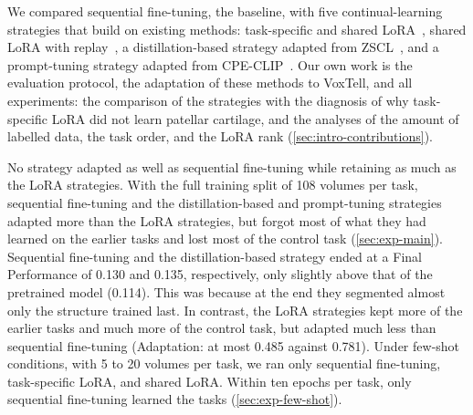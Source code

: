 We compared sequential fine-tuning, the baseline, with five continual-learning strategies that build on existing methods: task-specific and shared LoRA~\cite{hu2022lora}, shared LoRA with replay~\cite[Sec.~3.1]{delange2022}, a distillation-based strategy adapted from ZSCL~\cite{zheng2023preventingzeroshottransferdegradation}, and a prompt-tuning strategy adapted from CPE-CLIP~\cite{D_Alessandro_2023}.
Our own work is the evaluation protocol, the adaptation of these methods to VoxTell, and all experiments: the comparison of the strategies with the diagnosis of why task-specific LoRA did not learn patellar cartilage, and the analyses of the amount of labelled data, the task order, and the LoRA rank (\cref{sec:intro-contributions}).

No strategy adapted as well as sequential fine-tuning while retaining as much as the LoRA strategies.
With the full training split of 108 volumes per task, sequential fine-tuning and the distillation-based and prompt-tuning strategies adapted more than the LoRA strategies, but forgot most of what they had learned on the earlier tasks and lost most of the control task (\cref{sec:exp-main}).
Sequential fine-tuning and the distillation-based strategy ended at a Final Performance of 0.130 and 0.135, respectively, only slightly above that of the pretrained model (0.114).
This was because at the end they segmented almost only the structure trained last.
In contrast, the LoRA strategies kept more of the earlier tasks and much more of the control task, but adapted much less than sequential fine-tuning (Adaptation: at most 0.485 against 0.781).
Under few-shot conditions, with 5 to 20 volumes per task, we ran only sequential fine-tuning, task-specific LoRA, and shared LoRA.
Within ten epochs per task, only sequential fine-tuning learned the tasks (\cref{sec:exp-few-shot}).
